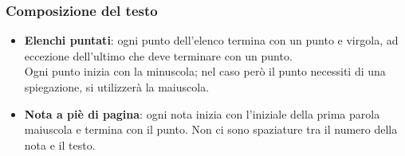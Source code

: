 		\subsubsection{Composizione del testo}
		\begin{itemize}
			\item \textbf{Elenchi puntati}: ogni punto dell'elenco termina con un punto e virgola, ad eccezione dell'ultimo che deve terminare con un punto. \\
			Ogni punto inizia con la minuscola; nel caso però il punto necessiti di una spiegazione, si utilizzerà la maiuscola. %
			\item \textbf{Nota a piè di pagina}: ogni nota inizia con l'iniziale della prima parola maiuscola e termina con il punto. Non ci sono spaziature tra il numero della nota e il testo.
		\end{itemize}
